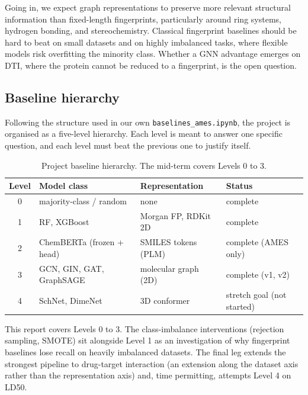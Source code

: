 \documentclass[a4paper,11pt]{article}
\begin{document}
Going in, we expect graph representations to preserve more relevant structural information than fixed-length fingerprints, particularly around ring systems, hydrogen bonding, and stereochemistry. Classical fingerprint baselines should be hard to beat on small datasets and on highly imbalanced tasks, where flexible models risk overfitting the minority class. Whether a GNN advantage emerges on DTI, where the protein cannot be reduced to a fingerprint, is the open question.

\subsection{Baseline hierarchy}

Following the structure used in our own \texttt{baselines\_ames.ipynb}, the project is organised as a five-level hierarchy. Each level is meant to answer one specific question, and each level must beat the previous one to justify itself.

\begin{table}[H]
\centering
\caption{Project baseline hierarchy. The mid-term covers Levels 0 to 3.}
\label{tab:hierarchy}
\begin{tabular}{clll}
\toprule
\textbf{Level} & \textbf{Model class} & \textbf{Representation} & \textbf{Status} \\
\midrule
0 & majority-class / random          & none                       & complete \\
1 & RF, XGBoost                      & Morgan FP, RDKit 2D        & complete \\
2 & ChemBERTa (frozen + head)        & SMILES tokens (PLM)        & complete (AMES only) \\
3 & GCN, GIN, GAT, GraphSAGE         & molecular graph (2D)       & complete (v1, v2) \\
4 & SchNet, DimeNet                  & 3D conformer               & stretch goal (not started) \\
\bottomrule
\end{tabular}
\end{table}

This report covers Levels 0 to 3. The class-imbalance interventions (rejection sampling, SMOTE) sit alongside Level 1 as an investigation of why fingerprint baselines lose recall on heavily imbalanced datasets. The final leg extends the strongest pipeline to drug-target interaction (an extension along the dataset axis rather than the representation axis) and, time permitting, attempts Level 4 on LD50.
\end{document}
